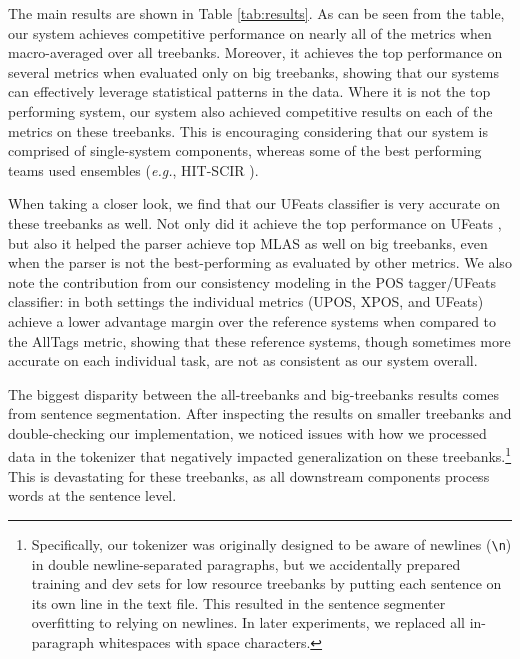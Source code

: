 \documentclass[11pt,a4paper]{article}
\newcommand{\fone}{}
\begin{document}
The main results are shown in Table \ref{tab:results}.
As can be seen from the table, our system achieves competitive performance on nearly all of the metrics when macro-averaged over all treebanks.
Moreover, it achieves the top performance on several metrics when evaluated only on big treebanks, showing that our systems can effectively leverage statistical patterns in the data.
Where it is not the top performing system, our system also achieved competitive results on each of the metrics on these treebanks.
This is encouraging considering that our system is comprised of single-system components, whereas some of the best performing teams used ensembles (\emph{e.g.}, HIT-SCIR \cite{che18towards}).

When taking a closer look, we find that our UFeats classifier is very accurate on these treebanks as well.
Not only did it achieve the top performance on UFeats \fone, but also it helped the parser achieve top MLAS as well on big treebanks, even when the parser is not the best-performing as evaluated by other metrics.
We also note the contribution from our consistency modeling in the POS tagger/UFeats classifier: in both settings the individual metrics (UPOS, XPOS, and UFeats) achieve a lower advantage margin over the reference systems when compared to the AllTags metric, showing that these reference systems, though sometimes more accurate on each individual task, are not as consistent as our system overall.

The biggest disparity between the all-treebanks and big-treebanks results comes from sentence segmentation.
After inspecting the results on smaller treebanks and double-checking our implementation, we noticed issues with how we processed data in the tokenizer that negatively impacted generalization on these treebanks.\footnote{Specifically, our tokenizer was originally designed to be aware of newlines (\texttt{\textbackslash{}n}) in double newline-separated paragraphs, but we accidentally prepared training and dev sets for low resource treebanks by putting each sentence on its own line in the text file.
This resulted in the sentence segmenter overfitting to relying on newlines. In later experiments, we replaced all in-paragraph whitespaces with space characters.}
This is devastating for these treebanks, as all downstream components process words at the sentence level.
\end{document}
